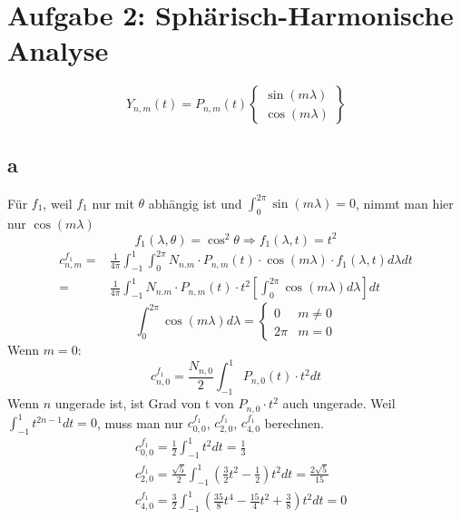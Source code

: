 \section{Aufgabe 2: Sphärisch-Harmonische Analyse}
\begin{equation}
	Y_{n,m}(t) = P_{n,m}(t) \begin{Bmatrix}
	\sin(m\lambda) \\
	\cos(m \lambda)
	\end{Bmatrix}
\end{equation}
\subsection{a}
Für $f_1$, weil $f_1$ nur mit $\theta$ abhängig ist und $\int_{0}^{2\pi}\sin(m\lambda) = 0$, nimmt man hier nur $\cos(m\lambda)$
\begin{equation}
	f_1(\lambda,\theta) = \cos^2\theta \Longrightarrow f_1(\lambda,t) = t^2 
\end{equation}
\begin{align}
	c_{n,m}^{f_1} = & \frac{1}{4\pi} \int_{-1}^{1} \int_{0}^{2\pi} N_{n.m} \cdot P_{n,m}(t) \cdot \cos(m\lambda) \cdot f_1(\lambda,t) d\lambda dt \\
	= & \frac{1}{4\pi} \int_{-1}^{1} N_{n.m} \cdot P_{n,m}(t) \cdot t^2  \left[\int_{0}^{2\pi} \cos(m\lambda) d\lambda\right]  dt
\end{align}
\begin{equation}
	\int_{0}^{2\pi} \cos(m\lambda) d\lambda = \begin{cases}
	0 & m \neq 0 \\
	2\pi & m=0
	\end{cases}
\end{equation}
Wenn $m=0$:
\begin{equation}
	c_{n,0}^{f_1} = \frac{N_{n,0}}{2} \int_{-1}^{1} P_{n,0}(t) \cdot t^2 dt
\end{equation}
Wenn $n$ ungerade ist, ist Grad von t von $P_{n,0}\cdot t^2$ auch ungerade. Weil $\int_{-1}^{1} t^{2n-1}dt = 0$, muss man nur $c_{0,0}^{f_1}$, $c_{2,0}^{f_1}$, $c_{4,0}^{f_1}$ berechnen.
\begin{align}
	& c_{0,0}^{f_1} = \frac{1}{2} \int_{-1}^{1} t^2 dt = \frac{1}{3} \\
	& c_{2,0}^{f_1} = \frac{\sqrt{5}}{2} \int_{-1}^{1} (\frac{3}{2}t^2-\frac{1}{2})t^2dt = \frac{2\sqrt{5}}{15} \\
	& c_{4,0}^{f_1} = \frac{3}{2} \int_{-1}^{1} (\frac{35}{8}t^4 - \frac{15}{4}t^2 + \frac{3}{8})t^2dt = 0
\end{align}
